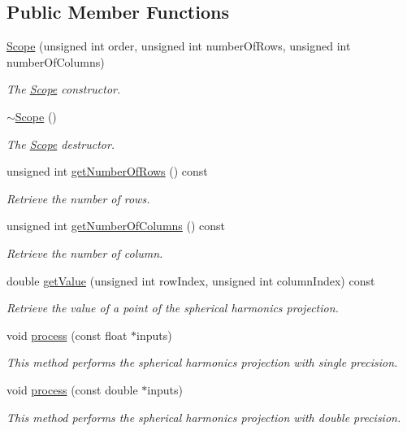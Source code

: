 \subsection*{Public Member Functions}
\begin{DoxyCompactItemize}
\item 
\hyperlink{class_hoa3_d_1_1_scope_ab4f5ff6674c4df165a1455e4648e1c35}{Scope} (unsigned int order, unsigned int number\-Of\-Rows, unsigned int number\-Of\-Columns)
\begin{DoxyCompactList}\small\item\em The \hyperlink{class_hoa3_d_1_1_scope}{Scope} constructor. \end{DoxyCompactList}\item 
\hyperlink{class_hoa3_d_1_1_scope_a84990cf90c7b3be0963f4cacbdab1df8}{$\sim$\-Scope} ()
\begin{DoxyCompactList}\small\item\em The \hyperlink{class_hoa3_d_1_1_scope}{Scope} destructor. \end{DoxyCompactList}\item 
unsigned int \hyperlink{class_hoa3_d_1_1_scope_aab635359344e855d855972752e6766c9}{get\-Number\-Of\-Rows} () const 
\begin{DoxyCompactList}\small\item\em Retrieve the number of rows. \end{DoxyCompactList}\item 
unsigned int \hyperlink{class_hoa3_d_1_1_scope_abdee40de6953ec537bbc72154ac93e6e}{get\-Number\-Of\-Columns} () const 
\begin{DoxyCompactList}\small\item\em Retrieve the number of column. \end{DoxyCompactList}\item 
double \hyperlink{class_hoa3_d_1_1_scope_a5dd62de174f903097d992da4f108037e}{get\-Value} (unsigned int row\-Index, unsigned int column\-Index) const 
\begin{DoxyCompactList}\small\item\em Retrieve the value of a point of the spherical harmonics projection. \end{DoxyCompactList}\item 
void \hyperlink{class_hoa3_d_1_1_scope_a4e9866933d1b863860ffd64b0514a6e6}{process} (const float $\ast$inputs)
\begin{DoxyCompactList}\small\item\em This method performs the spherical harmonics projection with single precision. \end{DoxyCompactList}\item 
void \hyperlink{class_hoa3_d_1_1_scope_ae9a788e0352011e3ad7ad5f88b5b12ed}{process} (const double $\ast$inputs)
\begin{DoxyCompactList}\small\item\em This method performs the spherical harmonics projection with double precision. \end{DoxyCompactList}\end{DoxyCompactItemize}


